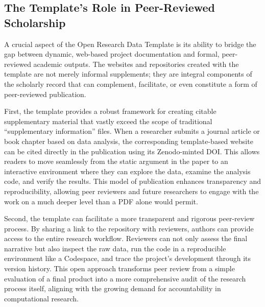 \documentclass[final]{anthology-ch} %
\begin{document}
\subsection{The Template's Role in Peer-Reviewed Scholarship}\label{the-templates-role-in-peer-reviewed-scholarship}

A crucial aspect of the Open Research Data Template is its ability to bridge the gap between dynamic, web-based project documentation and formal, peer-reviewed academic outputs. The websites and repositories created with the template are not merely informal supplements; they are integral components of the scholarly record that can complement, facilitate, or even constitute a form of peer-reviewed publication.

First, the template provides a robust framework for creating citable supplementary material that vastly exceed the scope of traditional ``supplementary information'' files. When a researcher submits a journal article or book chapter based on data analysis, the corresponding template-based website can be cited directly in the publication using its Zenodo-minted DOI. This allows readers to move seamlessly from the static argument in the paper to an interactive environment where they can explore the data, examine the analysis code, and verify the results. This model of publication enhances transparency and reproducibility, allowing peer reviewers and future researchers to engage with the work on a much deeper level than a PDF alone would permit.

Second, the template can facilitate a more transparent and rigorous peer-review process. By sharing a link to the repository with reviewers, authors can provide access to the entire research workflow. Reviewers can not only assess the final narrative but also inspect the raw data, run the code in a reproducible environment like a Codespace, and trace the project's development through its version history. This open approach transforms peer review from a simple evaluation of a final product into a more comprehensive audit of the research process itself, aligning with the growing demand for accountability in computational research.
\end{document}

